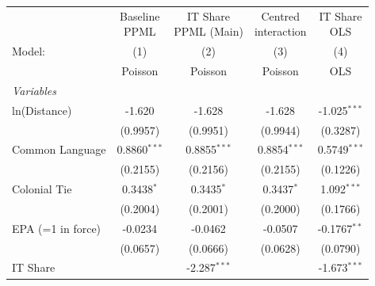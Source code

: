
\begingroup
\centering
\begin{tabular}{lcccc}
   \tabularnewline \midrule \midrule
                                    & \makecell{Baseline\\PPML}    & \makecell{IT Share\\PPML (Main)}    & \makecell{Centred\\interaction}    & \makecell{IT Share\\OLS} \\      
   Model:                           & (1)                          & (2)                                 & (3)                                & (4)\\  
                                    &  Poisson                     & Poisson                             & Poisson                            & OLS\\  
   \midrule
   \emph{Variables}\\
   ln(Distance)                     & -1.620                       & -1.628                              & -1.628                             & -1.025$^{***}$\\   
                                    & (0.9957)                     & (0.9951)                            & (0.9944)                           & (0.3287)\\   
   Common Language                  & 0.8860$^{***}$               & 0.8855$^{***}$                      & 0.8854$^{***}$                     & 0.5749$^{***}$\\   
                                    & (0.2155)                     & (0.2156)                            & (0.2155)                           & (0.1226)\\   
   Colonial Tie                     & 0.3438$^{*}$                 & 0.3435$^{*}$                        & 0.3437$^{*}$                       & 1.092$^{***}$\\   
                                    & (0.2004)                     & (0.2001)                            & (0.2000)                           & (0.1766)\\   
   EPA (=1 in force)                & -0.0234                      & -0.0462                             & -0.0507                            & -0.1767$^{**}$\\   
                                    & (0.0657)                     & (0.0666)                            & (0.0628)                           & (0.0790)\\   
   IT Share                         &                              & -2.287$^{***}$                      &                                    & -1.673$^{***}$\\   

\end{tabular}
